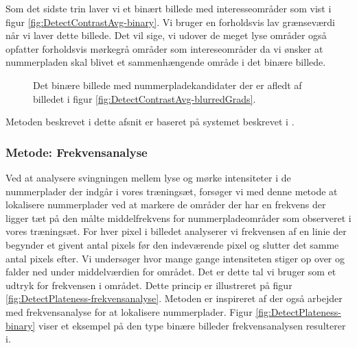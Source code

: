 Som det sidste trin laver vi et binært billede med interesseområder som vist i figur \vref{fig:DetectContrastAvg-binary}. Vi bruger en forholdsvis lav grænseværdi når vi laver dette billede. Det vil sige, vi udover de meget lyse områder også opfatter forholdsvis mørkegrå områder som intereseområder da vi ønsker at nummerpladen skal blivet et sammenhængende område i det binære billede.

\begin{figure}[htp]
  \centering
  \caption{Det binære billede med nummerpladekandidater der er afledt af billedet i figur \vref{fig:DetectContrastAvg-blurredGrads}.}
  \label{fig:DetectContrastAvg-binary}
\end{figure}

Metoden beskrevet i dette afsnit er baseret på systemet beskrevet i \cite{shapiro}.

\subsubsection{Metode: Frekvensanalyse}
\label{sec:DetectPlateness}
Ved at analysere svingningen mellem lyse og mørke intensiteter i de nummerplader der indgår i vores træningsæt, forsøger vi med denne metode at lokalisere nummerplader ved at markere de områder der har en frekvens der ligger tæt på den målte middelfrekvens for nummerpladeområder som observeret i vores træningsæt.  For hver pixel i billedet analyserer vi frekvensen af en linie der begynder et givent antal pixels før den indeværende pixel og slutter det samme antal pixels efter. Vi undersøger hvor mange gange intensiteten stiger op over og falder ned under middelværdien for området. Det er dette tal vi bruger som et udtryk for frekvensen i området. Dette princip er illustreret på figur \vref{fig:DetectPlateness-frekvensanalyse}. Metoden er inspireret af \cite{kwas} der også arbejder med frekvensanalyse for at lokalisere nummerplader. Figur \vref{fig:DetectPlateness-binary} viser et eksempel på den type binære billeder frekvensanalysen resulterer i.

